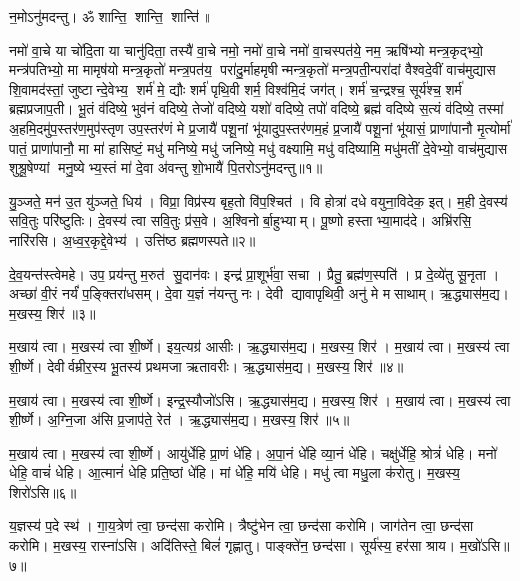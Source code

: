 \setcounter{anuvakam}{0}
न॒मोऽनु॑मदन्तु। ॐ शान्ति॒ शान्ति॒ शान्ति॑॥ 

नमो॑ वा॒चे या चो॑दि॒ता या चानु॑दिता॒ तस्यै॑ वा॒चे नमो॒ नमो॑ वा॒चे नमो॑ वा॒चस्पत॑ये॒ नम॒ ऋषि॑भ्यो मन्त्र॒कृद्भ्यो॒ मन्त्र॑पतिभ्यो॒ मा मामृष॑यो मन्त्र॒कृतो॑ मन्त्र॒पत॑य॒ परा॑दु॒र्माहमृषीन्मन्त्र॒कृतो॑ मन्त्र॒पती॒न्परा॑दां वैश्वदे॒वीं वाच॑मुद्यास शि॒वामद॑स्तां॒ जुष्टान्दे॒वेभ्य॒ शर्म॑ मे॒ द्यौः  शर्म॑ पृथि॒वी शर्म॒ विश्व॑मि॒दं जग॑त्। शर्म॑ च॒न्द्रश्च॒ सूर्य॑श्च॒ शर्म॑ ब्रह्मप्रजाप॒ती। भू॒तं व॑दिष्ये॒ भुव॑नं वदिष्ये॒ तेजो॑ वदिष्ये॒ यशो॑ वदिष्ये॒ तपो॑ वदिष्ये॒ ब्रह्म॑ वदिष्ये स॒त्यं व॑दिष्ये॒ तस्मा॑ अ॒हमि॒दमु॑प॒स्तर॑ण॒मुप॑स्तृण उप॒स्तर॑णं मे प्र॒जायै॑ पशू॒नां भू॑यादुप॒स्तर॑णम॒हं प्र॒जायै॑ पशू॒नां भू॑यासं॒ प्राणा॑पानौ मृ॒त्योर्मा॑ पातं॒ प्राणा॑पानौ॒ मा मा॑ हासिष्टं॒ मधु॑ मनिष्ये॒ मधु॑ जनिष्ये॒ मधु॑ वक्ष्यामि॒ मधु॑ वदिष्यामि॒ मधु॑मतीं दे॒वेभ्यो॒ वाच॑मुद्यास शुश्रू॒षेण्यां मनु॒ष्येभ्य॒स्तं मा॑ दे॒वा अ॑वन्तु शो॒भायै॑ पि॒तरोऽनु॑मदन्तु॥१॥
\anuvakamend

यु॒ञ्जते॒ मन॑ उ॒त यु॑ञ्जते॒ धिय॑। विप्रा॒ विप्र॑स्य बृह॒तो वि॑प॒श्चित॑। वि होत्रा॑ दधे वयुना॒विदेक॒ इत्। म॒ही दे॒वस्य॑ सवि॒तुः परि॑ष्टुतिः। दे॒वस्य॑ त्वा सवि॒तुः प्र॑स॒वे। अ॒श्विनोर्बा॒हुभ्याम्। पू॒ष्णो हस्ताभ्या॒माद॑दे। अभ्रि॑रसि॒ नारि॑रसि। अ॒ध्व॒र॒कृद्दे॒वेभ्य॑। उत्ति॑ष्ठ ब्रह्मणस्पते॥२॥

दे॒व॒यन्त॑स्त्वेमहे। उप॒ प्रय॑न्तु म॒रुत॑ सु॒दान॑वः। इन्द्र॑ प्रा॒शूर्भ॑वा॒ सचा। प्रैतु॒ ब्रह्म॑ण॒स्पति॑। प्र दे॒व्ये॑तु सू॒नृता। अच्छा॑ वी॒रं नर्यं॑ प॒ङ्क्तिरा॑धसम्। दे॒वा य॒ज्ञं न॑यन्तु नः। देवी द्यावापृथिवी॒ अनु॑ मे मसाथाम्। ऋ॒द्ध्यास॑म॒द्य। म॒खस्य॒ शिर॑॥३॥

म॒खाय॑ त्वा। म॒खस्य॑ त्वा शी॒र्ष्णे। इय॒त्यग्र॑ आसीः। ऋ॒द्ध्यास॑म॒द्य। म॒खस्य॒ शिर॑। म॒खाय॑ त्वा। म॒खस्य॑ त्वा शी॒र्ष्णे। देवीर्वम्रीर॒स्य भू॒तस्य॑ प्रथमजा ऋतावरीः। ऋ॒द्ध्यास॑म॒द्य। म॒खस्य॒ शिर॑॥४॥

म॒खाय॑ त्वा। म॒खस्य॑ त्वा शी॒र्ष्णे। इन्द्र॒स्यौजो॑ऽसि। ऋ॒द्ध्यास॑म॒द्य। म॒खस्य॒ शिर॑। म॒खाय॑ त्वा। म॒खस्य॑ त्वा शी॒र्ष्णे। अ॒ग्नि॒जा अ॑सि प्र॒जाप॑ते॒ रेत॑। ऋ॒द्ध्यास॑म॒द्य। म॒खस्य॒ शिर॑॥५॥

म॒खाय॑ त्वा। म॒खस्य॑ त्वा शी॒र्ष्णे। आयु॑र्धेहि प्रा॒णं धे॑हि। अ॒पा॒नं धे॑हि व्या॒नं धे॑हि। चक्षु॑र्धेहि॒ श्रोत्रं॑ धेहि। मनो॑ धेहि॒ वाचं॑ धेहि। आ॒त्मानं॑ धेहि प्रति॒ष्ठां धे॑हि। मां धे॑हि॒ मयि॑ धेहि। मधु॑ त्वा मधु॒ला क॑रोतु। म॒खस्य॒ शिरो॑ऽसि॥६॥

य॒ज्ञस्य॑ प॒दे स्थ॑। गा॒य॒त्रेण॑ त्वा॒ छन्द॑सा करोमि। त्रैष्टु॑भेन त्वा॒ छन्द॑सा करोमि। जाग॑तेन त्वा॒ छन्द॑सा करोमि। म॒खस्य॒ रास्ना॑ऽसि। अदि॑तिस्ते॒ बिलं॑ गृह्णातु। पाङ्क्ते॑न॒ छन्द॑सा। सूर्य॑स्य॒ हर॑सा श्राय। म॒खो॑ऽसि॥७॥
\anuvakamend[प॒ते॒ शिर॑ ऋतावरीर्\mbox{}ऋ॒द्ध्यास॑म॒द्य म॒खस्य॒ शिर॒ शिर॒ शिरो॑ऽसि॒ नव॑ च%
]

